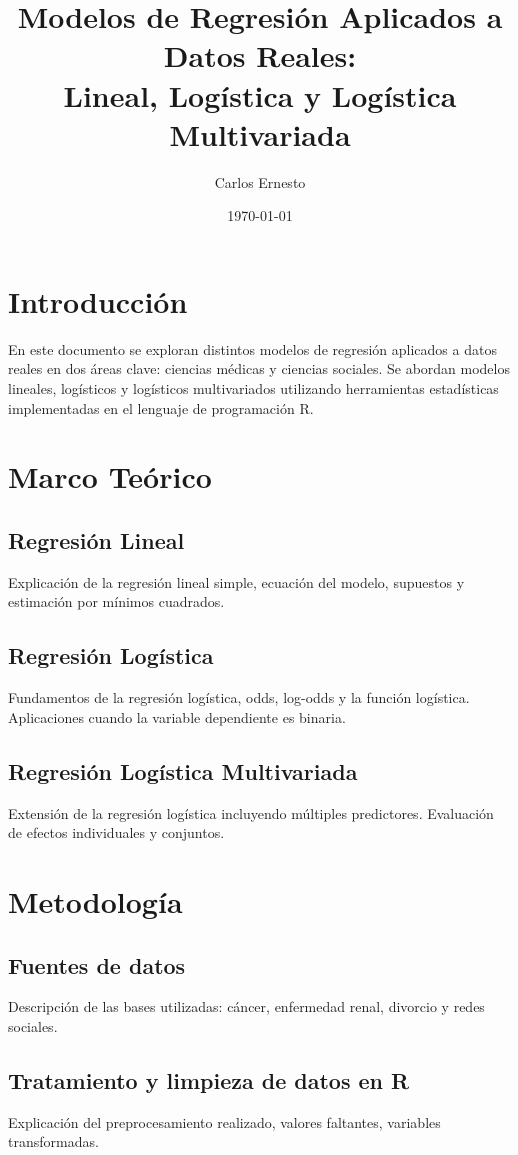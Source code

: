 \documentclass[12pt]{article}
\title{Modelos de Regresión Aplicados a Datos Reales:\\Lineal, Logística y Logística Multivariada}
\author{Carlos Ernesto}
\date{\today}
\begin{document}
\maketitle
\tableofcontents
\newpage

\section{Introducción}
En este documento se exploran distintos modelos de regresión aplicados a datos reales en dos áreas clave: ciencias médicas y ciencias sociales. Se abordan modelos lineales, logísticos y logísticos multivariados utilizando herramientas estadísticas implementadas en el lenguaje de programación R.

\section{Marco Teórico}
\subsection{Regresión Lineal}
Explicación de la regresión lineal simple, ecuación del modelo, supuestos y estimación por mínimos cuadrados.

\subsection{Regresión Logística}
Fundamentos de la regresión logística, odds, log-odds y la función logística. Aplicaciones cuando la variable dependiente es binaria.

\subsection{Regresión Logística Multivariada}
Extensión de la regresión logística incluyendo múltiples predictores. Evaluación de efectos individuales y conjuntos.

\section{Metodología}
\subsection{Fuentes de datos}
Descripción de las bases utilizadas: cáncer, enfermedad renal, divorcio y redes sociales.

\subsection{Tratamiento y limpieza de datos en R}
Explicación del preprocesamiento realizado, valores faltantes, variables transformadas.
\end{document}
